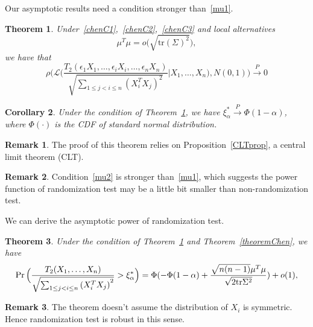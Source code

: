 \documentclass[review]{elsarticle}
\theoremstyle{plain}
\newtheorem{theorem}{\quad\quad Theorem}
\newtheorem{corollary}[theorem]{Corollary}
\theoremstyle{definition}
\newtheorem{remark}{\quad\quad Remark}
\theoremstyle{remark}
\begin{document}
Our asymptotic results need a condition stronger than~\eqref{mu1}.
\begin{theorem}\label{shaziCLT}
    Under~\eqref{chenC1},~\eqref{chenC2},~\eqref{chenC3} and local alternatives
    \begin{equation}\label{mu2}
        \mu^T\mu=o\big(\sqrt{\mathrm{tr}{(\Sigma)}^2}\big),
    \end{equation}
    we have that
    \begin{equation*}
        \rho\Big(\mathcal{L}\Big(\frac{T_2(\epsilon_1 X_1,\ldots, \epsilon_i X_i,\ldots,\epsilon_n X_n)}{\sqrt{\sum_{1\leq j<i\leq n}{(X_i^T X_j)}^2}}\Big|X_1,\ldots,X_n\Big),N(0,1)\Big)\xrightarrow{P} 0
    \end{equation*}
\end{theorem}
\begin{corollary}\label{corollaryQuan}
    Under the condition of Theorem~\ref{shaziCLT}, we have $\xi_{\alpha}^*\xrightarrow{P} \Phi(1-\alpha)$, where $\Phi(\cdot)$ is the CDF of standard normal distribution.
\end{corollary}
\begin{remark}
    The proof of this theorem relies on Proposition~\ref{CLTprop}, a central limit theorem (CLT). 
\end{remark}
\begin{remark}
    Condition~\eqref{mu2} is stronger than~\eqref{mu1}, which suggests the power function of randomization test may be a little bit smaller than non-randomization test.
\end{remark}

We can derive the asymptotic power of randomization test.
\begin{theorem}\label{theoremPower}
    Under the condition of Theorem~\ref{shaziCLT} and Theorem~\ref{theoremChen}, we have 
    \begin{equation*}
            \Pr\Big(\frac{T_2( X_1,\ldots, X_n)}{\sqrt{\sum_{1\leq j<i\leq n}{(X_i^T X_j)}^2}}>\xi_{\alpha}^* \Big)\\
            =
            \Phi(-\Phi(1-\alpha)+\frac{\sqrt{n(n-1)}\mu^T\mu}{\sqrt{2\mathrm{tr}\Sigma^2}})+o(1),
    \end{equation*}
\end{theorem}

\begin{remark}
    The theorem doesn't assume the distribution of $X_i$ is symmetric. Hence randomization test is robust in this sense.
\end{remark}
\end{document}
